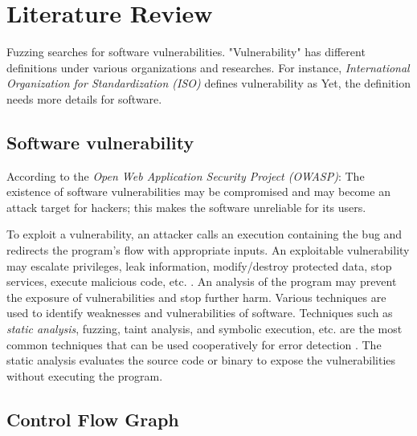 \section{Literature Review} \label{sec:2-lit}

Fuzzing searches for software vulnerabilities. "Vulnerability" has different definitions under various organizations and researches. For instance, \textit{International Organization for Standardization (ISO)} defines vulnerability as  \cite{iso27008} Yet, the definition needs more details for software. 

\subsection{Software vulnerability}
\label{sec:2.2.1}

According to the \textit{Open Web Application Security Project (OWASP)}:  The existence of software vulnerabilities may be compromised and may become an attack target for hackers; this makes the software unreliable for its users.

To exploit a vulnerability, an attacker calls an execution containing the bug and redirects the program's flow with appropriate inputs. An exploitable vulnerability may escalate privileges, leak information, modify/destroy protected data, stop services, execute malicious code, etc. \cite{chang2011trend}. An analysis of the program may prevent the exposure of vulnerabilities and stop further harm. Various techniques are used to identify weaknesses and vulnerabilities of software. Techniques such as \textit{static analysis}, fuzzing, taint analysis, and symbolic execution, etc. are the most common techniques that can be used cooperatively for error detection \cite{su2016vuldetection}. The static analysis evaluates the source code or binary to expose the vulnerabilities without executing the program.

\subsection{Control Flow Graph}


